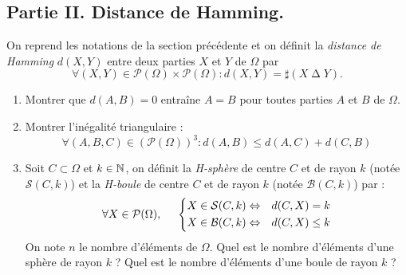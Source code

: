 \subsection*{Partie II. Distance de Hamming.}
On reprend les notations de la section précédente et on définit la \emph{distance de Hamming} $d(X,Y)$ entre deux parties $X$ et $Y$ de $\Omega$ par
\begin{displaymath}
\forall (X,Y)\in \mathcal P(\Omega)\times \mathcal P(\Omega) :
d(X,Y)= \sharp (X\mathop{\Delta} Y).
\end{displaymath}
\begin{enumerate}
 \item Montrer que  $d(A,B)=0$ entraîne $A=B$ pour toutes parties $A$ et $B$ de $\Omega$.

 \item Montrer l'inégalité triangulaire :
\begin{displaymath}
 \forall(A,B,C)\in\left( \mathcal P(\Omega)\right)^3 : 
d(A,B) \leq d(A,C) + d(C,B) 
\end{displaymath}

  \item Soit $C \subset \Omega$ et $k \in  \mathbb{N}$, on définit la \emph{H-sphère} de centre $C$ et de rayon $k$ (notée $\mathcal S(C,k)$) et la \emph{H-boule} de centre $C$ et de rayon $k$ (notée $\mathcal B(C,k)$) par :
\begin{displaymath}
 \forall X \in \mathcal P(\Omega), \hspace{0.5cm}
\left\lbrace 
\begin{aligned}
X\in \mathcal S(C,k) &\Leftrightarrow& d(C,X) = k \\
X\in \mathcal B(C,k) &\Leftrightarrow& d(C,X) \leq k  
\end{aligned}
\right. 
\end{displaymath}
On note $n$ le nombre d'éléments de $\Omega$. Quel est le nombre d'éléments d'une sphère de rayon $k$ ? Quel est le nombre d'éléments d'une boule de rayon $k$ ?  
\end{enumerate}

